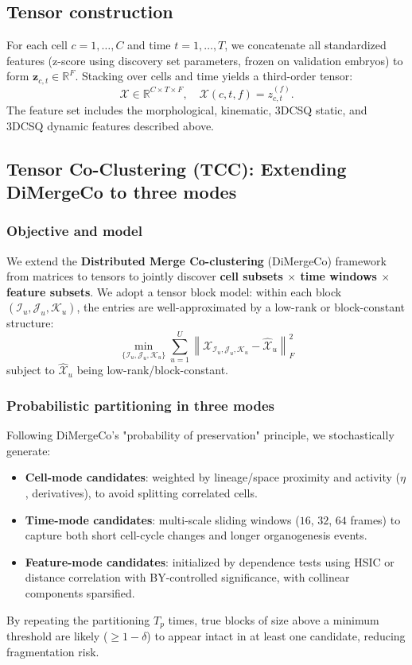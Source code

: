 \documentclass[unnumsec,webpdf,modern,large,namedate]{oup-authoring-template}%
\theoremstyle{thmstyleone}\newtheorem{theorem}{Theorem}
\theoremstyle{thmstyletwo}\newtheorem{example}{Example}
\theoremstyle{thmstylethree}\newtheorem{definition}{Definition}
\begin{document}
\subsection{Tensor construction}
For each cell $c = 1,\dots,C$ and time $t = 1,\dots,T$, we concatenate all standardized features (z-score using discovery set parameters, frozen on validation embryos) to form $\mathbf{z}_{c,t} \in \mathbb{R}^F$. Stacking over cells and time yields a third-order tensor:
\begin{equation}
\mathcal{X} \in \mathbb{R}^{C \times T \times F}, \quad \mathcal{X}(c,t,f) = z_{c,t}^{(f)}.
\label{eq:tensor-def}
\end{equation}
The feature set includes the morphological, kinematic, 3DCSQ static, and 3DCSQ dynamic features described above.

\subsection{Tensor Co-Clustering (TCC): Extending DiMergeCo to three modes}

\subsubsection{Objective and model}
We extend the \textbf{Distributed Merge Co-clustering} (DiMergeCo) framework from matrices to tensors to jointly discover \textbf{cell subsets $\times$ time windows $\times$ feature subsets}. We adopt a tensor block model: within each block $(\mathcal{I}_u,\mathcal{J}_u,\mathcal{K}_u)$, the entries are well-approximated by a low-rank or block-constant structure:
\begin{equation}
\min_{\{\mathcal{I}_u,\mathcal{J}_u,\mathcal{K}_u\}} \sum_{u=1}^{U} \left\| \mathcal{X}_{\mathcal{I}_u,\mathcal{J}_u,\mathcal{K}_u} - \hat{\mathcal{X}}_u \right\|_F^2
\label{eq:block-objective}
\end{equation}
subject to $\hat{\mathcal{X}}_u$ being low-rank/block-constant.

\subsubsection{Probabilistic partitioning in three modes}
Following DiMergeCo's "probability of preservation" principle, we stochastically generate:
\begin{itemize}
    \item \textbf{Cell-mode candidates}: weighted by lineage/space proximity and activity ($\eta$, derivatives), to avoid splitting correlated cells.
    \item \textbf{Time-mode candidates}: multi-scale sliding windows ($16$, $32$, $64$ frames) to capture both short cell-cycle changes and longer organogenesis events.
    \item \textbf{Feature-mode candidates}: initialized by dependence tests using HSIC or distance correlation with BY-controlled significance, with collinear components sparsified.
\end{itemize}
By repeating the partitioning $T_p$ times, true blocks of size above a minimum threshold are likely ($\geq 1-\delta$) to appear intact in at least one candidate, reducing fragmentation risk.
\end{document}
